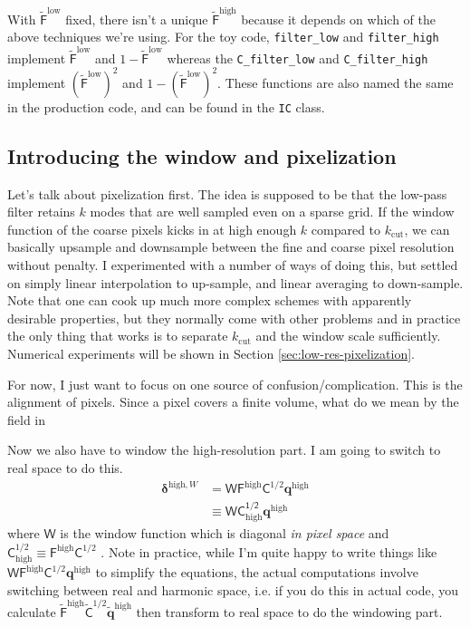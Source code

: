 \documentclass[11pt,a4paper,preprint]{aastex}
\newcommand{\low}{\mathrm{low}}
\newcommand{\high}{\mathrm{high}}
\newcommand{\bmath}[1]{\ensuremath{\bm{#1}}}
\renewcommand{\vec}[1]{\bmath{#1}}
\begin{document}
With $\tilde{\mathsf{F}}^{\low}$ fixed, there isn't a unique $\tilde{\mathsf{F}}^{\high}$ because
it depends on which of the above techniques we're using. For the toy code,
{\tt filter\_low} and {\tt filter\_high} implement $\tilde{\mathsf{F}}^{\low}$ and $1-\tilde{\mathsf{F}}^{\low}$
whereas the {\tt C\_filter\_low} and {\tt C\_filter\_high} implement $(\tilde{\mathsf{F}}^{\low})^2$ and $1-(\tilde{\mathsf{F}}^{\low})^2$.
These functions are also named the same in the production code, and can be found in the
{\tt IC} class.

\subsection{Introducing the window and pixelization}

Let's talk about pixelization first. The idea is supposed to be that
the low-pass filter retains $k$ modes that are well sampled even on a
sparse grid. If the window function of the coarse pixels kicks in at
high enough $k$ compared to $k_{\mathrm{cut}}$, we can basically
upsample and downsample between the fine and coarse pixel resolution
without penalty. I experimented with a number of ways of doing this,
but settled on simply linear interpolation to up-sample, and linear
averaging to down-sample. Note that one can cook up much more complex
schemes with apparently desirable properties, but they normally come
with other problems and in practice the only thing that works is to
separate  $k_{\mathrm{cut}}$ and the window scale
sufficiently. Numerical experiments will be shown in Section
\ref{sec:low-res-pixelization}. 

For now, I just want to focus on one source of
confusion/complication. This is the alignment of pixels. Since a pixel
covers a finite volume, what do we mean by the field in 

Now we also have to window the high-resolution part. I am going to switch to
real space to do this.
\begin{align}
\vec{\delta}^{\high,W} & = \mathsf{W} \mathsf{F}^{\high} \mathsf{C}^{1/2}
\vec{q}^{\high}\\
& \equiv \mathsf{WC_{\high}^{1/2}} \vec{q}^{\high} \label{eq:deltaII-ideal}
\end{align}
where $\mathsf{W}$ is the window function which is
diagonal {\it in pixel space} and $\mathsf{C}_{\high}^{1/2} \equiv
\mathsf{F}^{\high} \mathsf{C}^{1/2}$ .  Note in practice, while I'm quite happy to write
things like $\mathsf{W} \mathsf{F}^{\high} \mathsf{C}^{1/2} \vec{q}^{\high}$ to simplify
the equations, the actual
computations involve switching between real and harmonic space, i.e. if you do this in
actual code, you calculate
$\tilde{\mathsf{F}}^{\high} \tilde{\mathsf{C}}^{1/2} \tilde{\vec{q}}^{\high}$ then transform to real space to
do the windowing part.
\end{document}
